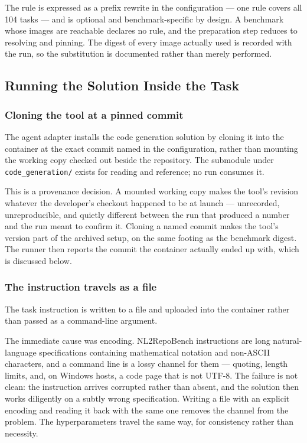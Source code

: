 The rule is expressed as a prefix rewrite in the configuration --- one rule
covers all 104 tasks --- and is optional and benchmark-specific by design. A
benchmark whose images are reachable declares no rule, and the preparation step
reduces to resolving and pinning. The digest of every image actually used is
recorded with the run, so the substitution is documented rather than merely
performed.


\subsection{Running the Solution Inside the Task}

\subsubsection{Cloning the tool at a pinned commit}

The agent adapter installs the code generation solution by cloning it into the
container at the exact commit named in the configuration, rather than mounting
the working copy checked out beside the repository. The submodule under
\texttt{code\_generation/} exists for reading and reference; no run consumes
it.

This is a provenance decision. A mounted working copy makes the tool's revision
whatever the developer's checkout happened to be at launch --- unrecorded,
unreproducible, and quietly different between the run that produced a number
and the run meant to confirm it. Cloning a named commit makes the tool's
version part of the archived setup, on the same footing as the benchmark
digest. The runner then reports the commit the container actually ended up
with, which is discussed below.

\subsubsection{The instruction travels as a file}

The task instruction is written to a file and uploaded into the container
rather than passed as a command-line argument.

The immediate cause was encoding. NL2RepoBench instructions are long
natural-language specifications containing mathematical notation and non-ASCII
characters, and a command line is a lossy channel for them --- quoting, length
limits, and, on Windows hosts, a code page that is not UTF-8. The failure is
not clean: the instruction arrives corrupted rather than absent, and the
solution then works diligently on a subtly wrong specification. Writing a file
with an explicit encoding and reading it back with the same one removes the
channel from the problem. The hyperparameters travel the same way, for
consistency rather than necessity.

